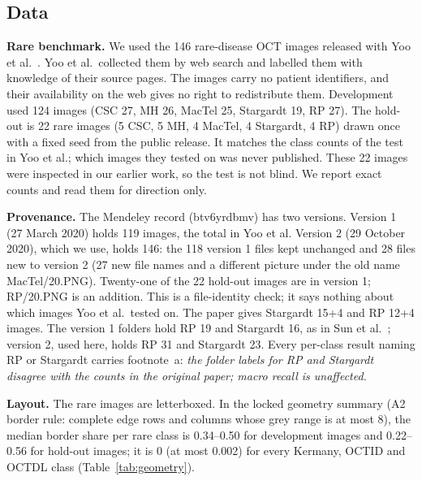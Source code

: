 \documentclass[conference]{IEEEtran}
\begin{document}
\subsection{Data}
\textbf{Rare benchmark.} We used the 146 rare-disease OCT images released with Yoo et al.\ \cite{Yoo2021}. Yoo et al.\ collected them by web search and labelled them with knowledge of their source pages. The images carry no patient identifiers, and their availability on the web gives no right to redistribute them. Development used 124 images (CSC 27, MH 26, MacTel 25, Stargardt 19, RP 27).
The hold-out is 22 rare images (5 CSC, 5 MH, 4 MacTel, 4 Stargardt, 4 RP) drawn once with a fixed seed from the public release. It matches the class counts of the test in Yoo et al.; which images they tested on was never published. These 22 images were inspected in our earlier work, so the test is not blind. We report exact counts and read them for direction only.

\textbf{Provenance.} The Mendeley record (btv6yrdbmv) has two versions. Version 1 (27 March 2020) holds 119 images, the total in Yoo et al. Version 2 (29 October 2020), which we use, holds 146: the 118 version 1 files kept unchanged and 28 files new to version 2 (27 new file names and a different picture under the old name MacTel/20.PNG). Twenty-one of the 22 hold-out images are in version 1; RP/20.PNG is an addition. This is a file-identity check; it says nothing about which images Yoo et al.\ tested on.
The paper gives Stargardt 15+4 and RP 12+4 images. The version 1 folders hold RP 19 and Stargardt 16, as in Sun et al.\ \cite{Sun2024}; version 2, used here, holds RP 31 and Stargardt 23. Every per-class result naming RP or Stargardt carries footnote~a: \emph{the folder labels for RP and Stargardt disagree with the counts in the original paper; macro recall is unaffected.}

\textbf{Layout.} The rare images are letterboxed. In the locked geometry summary (A2 border rule: complete edge rows and columns whose grey range is at most 8), the median border share per rare class is 0.34--0.50 for development images and 0.22--0.56 for hold-out images; it is 0 (at most 0.002) for every Kermany, OCTID and OCTDL class (Table~\ref{tab:geometry}).
\end{document}
